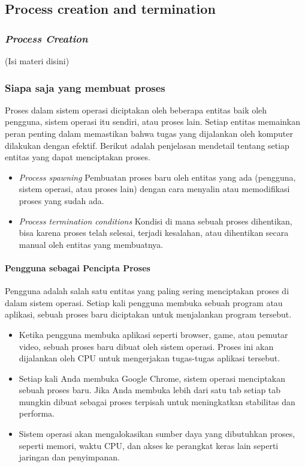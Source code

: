 \documentclass[12pt]{article}
\begin{document}
\subsection{Process creation and termination}

\subsubsection{\textit{Process Creation}}
(Isi materi disini)

\subsubsection{Siapa saja yang membuat proses}
Proses dalam sistem operasi diciptakan oleh beberapa entitas baik oleh pengguna, sistem operasi itu sendiri, atau proses lain. Setiap entitas memainkan peran penting dalam memastikan bahwa tugas yang dijalankan oleh komputer dilakukan dengan efektif. Berikut adalah penjelasan mendetail tentang setiap entitas yang dapat menciptakan proses.
\begin{itemize}
    \item \textit{Process spawning} Pembuatan proses baru oleh entitas yang ada (pengguna, sistem operasi, atau proses lain) dengan cara menyalin atau memodifikasi proses yang sudah ada.
    \item \textit{Process termination conditions} Kondisi di mana sebuah proses dihentikan, bisa karena proses telah selesai, terjadi kesalahan, atau dihentikan secara manual oleh entitas yang membuatnya.
\end{itemize}

\paragraph{Pengguna sebagai Pencipta Proses}
Pengguna adalah salah satu entitas yang paling sering menciptakan proses di dalam sistem operasi. Setiap kali pengguna membuka sebuah program atau aplikasi, sebuah proses baru diciptakan untuk menjalankan program tersebut.

\begin{itemize}
    \item  Ketika pengguna membuka aplikasi seperti browser, game, atau pemutar video, sebuah proses baru dibuat oleh sistem operasi. Proses ini akan dijalankan oleh CPU untuk mengerjakan tugas-tugas aplikasi tersebut.
    \item  Setiap kali Anda membuka Google Chrome, sistem operasi menciptakan sebuah proses baru. Jika Anda membuka lebih dari satu tab setiap tab mungkin dibuat sebagai proses terpisah untuk meningkatkan stabilitas dan performa.
    \item  Sistem operasi akan mengalokasikan sumber daya yang dibutuhkan proses, seperti memori, waktu CPU, dan akses ke perangkat keras lain seperti jaringan dan penyimpanan.
\end{itemize}
\end{document}
